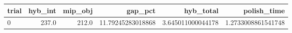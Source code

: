 \begin{tabular}{lrrrrr}
\hline
trial & hyb_int & mip_obj & gap_pct & hyb_total & polish_time \\ \hline
0 & 237.0 & 212.0 & 11.79245283018868 & 3.645011000044178 & 1.2733008861541748 \\
\hline
\end{tabular}
